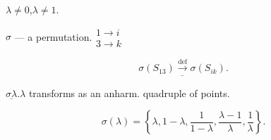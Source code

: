 $\lambda\ne0$,\quad $\lambda\ne1$.

$\sigma$ --- a permutation.\qquad $\begin{gathered}1\longrightarrow i\\3\longrightarrow k\end{gathered}$

\begin{equation*}\underline{\sigma (S_{13})\overset{\mathrm{def}}{\longrightarrow}\sigma (S_{ik})}.\end{equation*}

$\underline{\sigma\lambda}$.\qquad $\lambda$ transforms as an anharm. quadruple of points.

\begin{equation*}\sigma (\lambda)=\left\{\lambda,1-\lambda,\frac1{1-\lambda},\frac{\lambda-1}{\lambda},\frac1\lambda\right\}.\end{equation*}





